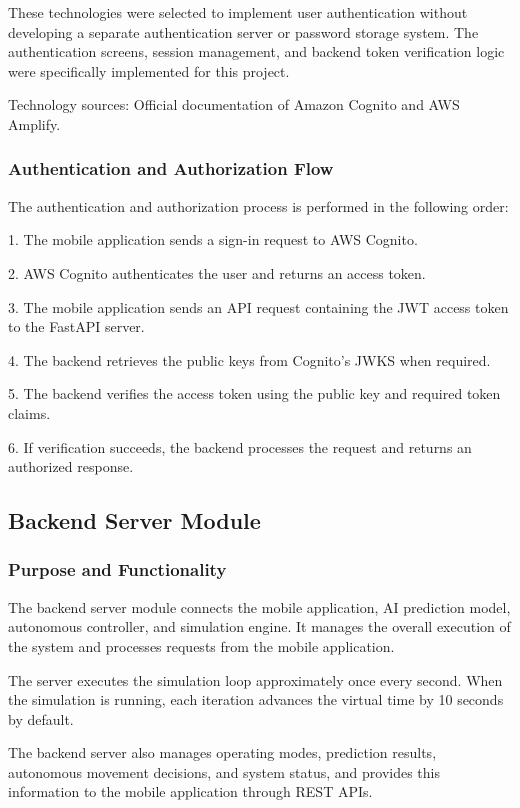 \documentclass[conference]{IEEEtran}
\begin{document}
These technologies were selected to implement user authentication without developing a separate authentication server or password storage system. The authentication screens, session management, and backend token verification logic were specifically implemented for this project.

Technology sources: Official documentation of Amazon Cognito and AWS Amplify.

\subsubsection{Authentication and Authorization Flow}

The authentication and authorization process is performed in the following order:

1. The mobile application sends a sign-in request to AWS Cognito.

2. AWS Cognito authenticates the user and returns an access token.

3. The mobile application sends an API request containing the JWT access token to the FastAPI server.

4. The backend retrieves the public keys from Cognito's JWKS when required.

5. The backend verifies the access token using the public key and required token claims.

6. If verification succeeds, the backend processes the request and returns an authorized response.

\subsection{Backend Server Module \cite{ref9,ref18}}

\subsubsection{Purpose and Functionality}

The backend server module connects the mobile application, AI prediction model, autonomous controller, and simulation engine. It manages the overall execution of the system and processes requests from the mobile application.

The server executes the simulation loop approximately once every second. When the simulation is running, each iteration advances the virtual time by 10 seconds by default.

The backend server also manages operating modes, prediction results, autonomous movement decisions, and system status, and provides this information to the mobile application through REST APIs.
\end{document}
